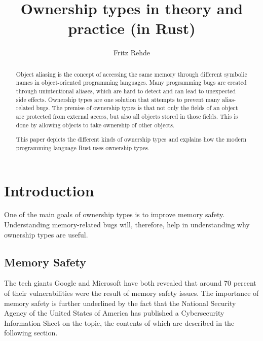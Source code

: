 \documentclass[sigplan,11pt,nonacm]{acmart}
\begin{document}
\title{Ownership types in theory and practice (in Rust)}
\author{Fritz Rehde}

\begin{abstract}

Object aliasing is the concept of accessing the same memory through different symbolic names in object-oriented programming languages.
Many programming bugs are created through unintentional aliases, which are hard to detect and can lead to unexpected side effects.
Ownership types are one solution that attempts to prevent many alias-related bugs.
The premise of ownership types is that not only the fields of an object are protected from external access, but also all objects stored in those fields.
This is done by allowing objects to take ownership of other objects.

This paper depicts the different kinds of ownership types and explains how the modern programming language Rust uses ownership types.

\end{abstract}


\maketitle

\section{Introduction}
\label{sec:introduction}

One of the main goals of ownership types is to improve memory safety.
Understanding memory-related bugs will, therefore, help in understanding why ownership types are useful.


\subsection{Memory Safety}
\label{sec:memory-safety}

The tech giants Google \cite{google-memory-safety} and Microsoft \cite{microsoft-memory-safety} have both revealed that around 70 percent of their vulnerabilities were the result of memory safety issues.
The importance of memory safety is further underlined by the fact that the National Security Agency of the United States of America has published a Cybersecurity Information Sheet \cite{nsa-memory-safety} on the topic, the contents of which are described in the following section.
\end{document}
